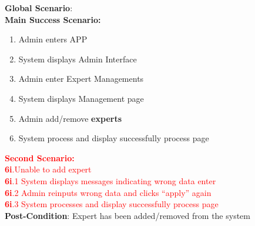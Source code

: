 	\textbf{Global Scenario}:
	\\ \textbf{Main Success Scenario:}
	\begin{enumerate}[{\bf 1.}]
		\item Admin enters APP
		\item System displays Admin Interface
		\item Admin enter Expert Managements
		\item System displays Management page
		\item Admin add/remove \textbf{experts}
		\item System process and display successfully process page

	\end{enumerate}
	\textcolor{red}{\textbf{Second Scenario:}}\\
	\textcolor{red}{\textbf{6i}.Unable to add expert}\\
	\textcolor{red}{\hspace{1em} \textbf{6i}.1 System displays messages indicating wrong data enter}\\
	\textcolor{red}{\hspace{1em} \textbf{6i}.2 Admin reinputs wrong data and clicks “apply” again}\\
	\textcolor{red}{\hspace{1em} \textbf{6i}.3 System processes and display successfully process page}\\
	\textbf{Post-Condition}: Expert has been added/removed from the system
